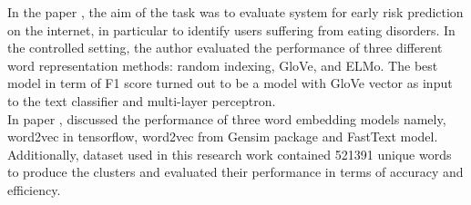 In the paper \cite{fano2019comparative}, the aim of the task was to evaluate system for early risk prediction on the internet, in particular to identify users suffering from eating disorders. In the controlled setting, the author evaluated the performance of three different word representation methods: random indexing, GloVe, and ELMo. The best model in term of F1 score turned out to be a model with GloVe vector as input to the text classifier and multi-layer perceptron.\\
In  paper \cite{ritu2018performance}, discussed the performance of three word embedding models namely, word2vec in tensorflow, word2vec from  Gensim package and FastText model. Additionally, dataset used in this research work contained 521391 unique words to produce the clusters and evaluated their performance in terms of accuracy and efficiency.\\

